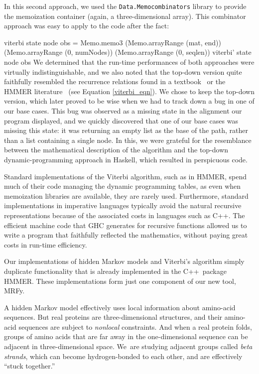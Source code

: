 \documentclass[preprint,nonatbib,blockstyle,nocopyrightspace,times]{sigplanconf}
\newenvironment{smallverbatim}{\par\small\verbatim}{\endverbatim}
\let\cite\citep
\begin{document}
In this second approach, we used the
\texttt{Data.Memocombinators} library to provide the memoization container 
(again, a three-dimensional array).
This combinator approach was easy to apply to the code after the fact:
\begin{smallverbatim}
viterbi state node obs = 
  Memo.memo3 (Memo.arrayRange (mat, end)) 
             (Memo.arrayRange (0, numNodes))
             (Memo.arrayRange (0, seqlen)) 
             viterbi' state node obs
\end{smallverbatim}
We determined that the run-time 
performances of both approaches were virtually indistinguishable, and we also 
noted that the top-down version quite faithfully resembled the recurrence 
relations found in a textbook~\cite{Durbin:1998wz} or the HMMER literature~\cite{Eddy:1998ut} 
(see Equation \ref{viterbi_eqn}).
We chose to keep the top-down version, which 
later proved to be wise when we had to track down a bug in one of our base 
cases.
This bug was observed as a missing state in the alignment our program 
displayed, and we quickly discovered that one of our base cases was missing 
this state: it was returning an empty list as the base of the path, rather than 
a list containing a single node.
In this, we were grateful for the resemblance 
between the mathematical description of the algorithm and the top-down 
dynamic-programming approach in Haskell, which resulted in perspicuous code.

Standard implementations of the Viterbi algorithm, such as in HMMER, spend much of their code
managing the dynamic programming tables, as even when memoization libraries are available,
they are rarely used.
Furthermore, standard implementations in imperative languages typically avoid the natural
recursive representations because of the associated costs in languages such as C++.
The efficient machine code that GHC generates for recursive functions allowed us to write
a program that faithfully reflected the mathematics, without paying great costs in run-time
efficiency.


Our implementations of hidden Markov models and Viterbi's algorithm
simply duplicate 
functionality that is already implemented in the C++~package
HMMER.
These implementations form just one component of our new tool, MRFy.

A hidden Markov model effectively uses local information about
amino-acid sequences.
But real proteins are three-dimensional structures,
and their amino-acid sequences are subject to \emph{nonlocal}
constraints. 
And when a real protein folds, groups of amino acids
that are far away in the one-dimensional sequence can be
adjacent in three-dimensional space.
We~are studying adjacent groups called \emph{beta strands}, which
can become hydrogen-bonded to each other,
and are effectively ``stuck together.''
\end{document}
